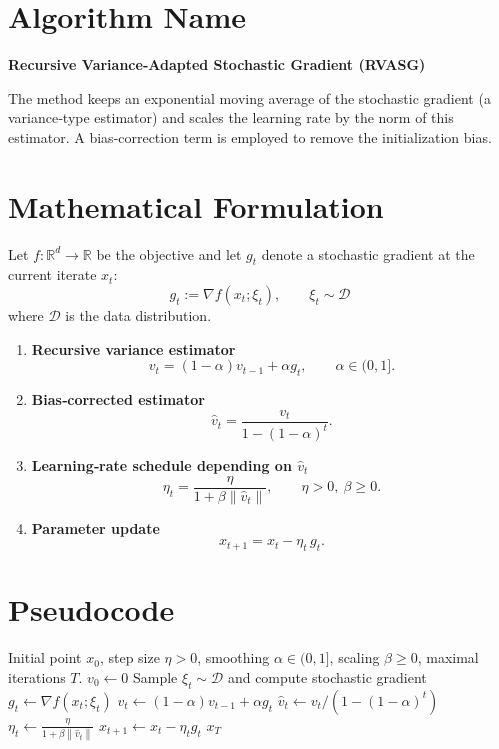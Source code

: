 \documentclass{article}
\newcommand{\norm}[1]{\left\lVert#1\right\rVert}
\begin{document}
\section*{Algorithm Name}
\textbf{Recursive Variance‑Adapted Stochastic Gradient (RVASG)}  

The method keeps an exponential moving average of the stochastic gradient (a variance‑type estimator) and scales the learning rate by the norm of this estimator. A bias‑correction term is employed to remove the initialization bias.

\section*{Mathematical Formulation}
Let $f:\mathbb{R}^d\rightarrow\mathbb{R}$ be the objective and let $g_t$ denote a stochastic gradient at the current iterate $x_t$:
\[
g_t := \nabla f(x_t; \xi_t),\qquad \xi_t\sim\mathcal{D}
\]
where $\mathcal{D}$ is the data distribution.  

\begin{enumerate}
\item \textbf{Recursive variance estimator}
\[
v_t = (1-\alpha)v_{t-1} + \alpha g_t,\qquad \alpha\in(0,1].
\tag{1}
\]
\item \textbf{Bias‑corrected estimator}
\[
\hat v_t = \frac{v_t}{1-(1-\alpha)^t}.
\tag{2}
\]
\item \textbf{Learning‑rate schedule depending on $\hat v_t$}
\[
\eta_t = \frac{\eta}{1+\beta \norm{\hat v_t}},\qquad \eta>0,\ \beta\ge 0.
\tag{3}
\]
\item \textbf{Parameter update}
\[
x_{t+1}=x_t-\eta_t\, g_t .
\tag{4}
\]
\end{enumerate}

\section*{Pseudocode}
\begin{algorithm}[H]
\caption{RVASG}
\begin{algorithmic}[1]
\Require Initial point $x_0$, step size $\eta>0$, smoothing $\alpha\in(0,1]$, scaling $\beta\ge0$, maximal iterations $T$.
\State $v_0\gets 0$ 
    \State Sample $\xi_t\sim\mathcal{D}$ and compute stochastic gradient $g_t\gets\nabla f(x_t;\xi_t)$
    \State $v_t\gets (1-\alpha)v_{t-1}+\alpha g_t$ 
    \State $\hat v_t\gets v_t/(1-(1-\alpha)^t)$ 
    \State $\eta_t\gets \displaystyle\frac{\eta}{1+\beta\norm{\hat v_t}}$ 
    \State $x_{t+1}\gets x_t-\eta_t g_t$ 
\EndFor
\State \Return $x_T$
\end{algorithmic}
\end{algorithm}
\end{document}

